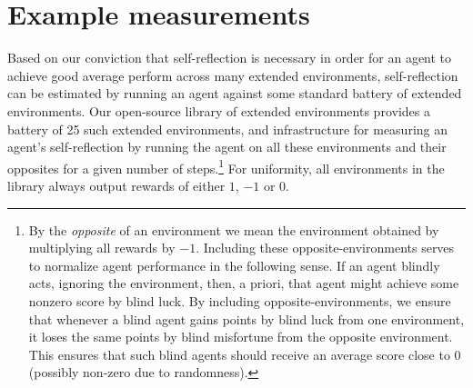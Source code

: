 \documentclass{article}
\begin{document}
\section{Example measurements}
\label{measurementssection}

Based on our conviction that self-reflection is necessary in order for an agent to
achieve good average perform across many extended environments, self-reflection can
be estimated by running an agent against some standard battery of extended environments.
Our open-source library of extended environments \cite{library} provides a battery of
25 such extended environments, and infrastructure for measuring an agent's self-reflection
by running the agent on all these environments and their opposites for a given number of
steps.\footnote{By the \emph{opposite} of an environment we mean the environment
obtained by multiplying
all rewards by $-1$. Including these opposite-environments serves to normalize
agent performance in the following sense. If an agent blindly acts, ignoring the environment,
then, a priori, that agent might achieve some nonzero score by blind luck. By including
opposite-environments, we ensure that whenever a blind agent gains points by blind luck
from one environment, it loses the same points by blind misfortune from the opposite
environment. This ensures that such blind agents should receive an average score close to
$0$ (possibly non-zero due to randomness).} For uniformity, all environments in the library
always output rewards of either $1$, $-1$ or $0$.
\end{document}
